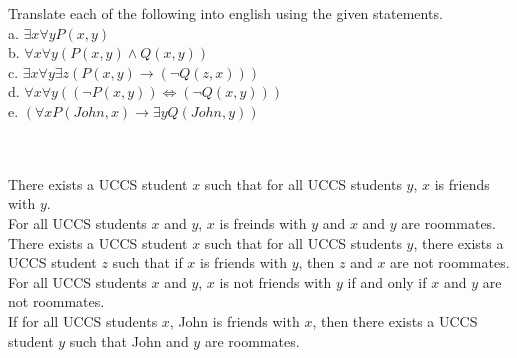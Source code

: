 Translate each of the following into english using the given statements.\\

a. $\exists x\forall yP(x,y)$\\

b. $\forall x\forall y(P(x,y)\land Q(x,y))$\\

c. $\exists x\forall y\exists z(P(x,y)\rightarrow (\neg Q(z,x)))$\\

d. $\forall x\forall y((\neg P(x,y))\iff (\neg Q(x,y)))$\\

e. $(\forall xP(John,x)\rightarrow \exists yQ(John,y))$\\\\

\begin{solution}\renewcommand{\qedsymbol}{}\ \\
    There exists a UCCS student $x$ such that for all UCCS students $y$, $x$ is friends with $y$.\\

    For all UCCS students $x$ and $y$, $x$ is freinds with $y$ and $x$ and $y$ are roommates.\\

    There exists a UCCS student $x$ such that for all UCCS students $y$, there exists a UCCS student $z$
    such that if $x$ is friends with $y$, then $z$ and $x$ are not roommates.\\

    For all UCCS students $x$ and $y$, $x$ is not friends with $y$ if and only if $x$ and $y$ are not
    roommates.\\

    If for all UCCS students $x$, John is friends with $x$, then there exists a UCCS student $y$ such
    that John and $y$ are roommates.

\end{solution}